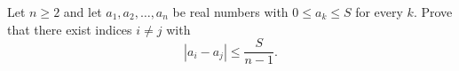 Let $n\ge2$ and let $a_1,a_2,\dots,a_n$ be real numbers with $0\le a_k\le S$ for every $k$. Prove that there exist indices $i\ne j$ with
\[
|a_i-a_j|\le\dfrac{S}{n-1}.
\]
